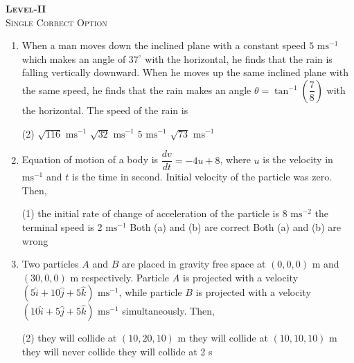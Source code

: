 \documentclass{article}
\renewcommand{\frac}[2]{\dfrac{#1}{#2}}
\begin{document}
\pagebreak

\begin{center}
    \textsc{\large\textbf{Level-II}}\\
    \textsc{Single Correct Option}
\end{center}
\begin{enumerate}
    \item When a man moves down the inclined plane with a constant speed \(5 \text{ ms}^{-1}\) which makes an angle of \(37^\circ\) with the horizontal, he finds that the rain is falling vertically downward. When he moves up the same inclined plane with the same speed, he finds that the rain makes an angle \(\theta = \tan^{-1}\left(\frac{7}{8}\right)\) with the horizontal. The speed of the rain is
    \begin{tasks}(2)
        \task \(\sqrt{116} \text{ ms}^{-1}\)
        \task \(\sqrt{32}  \text{ ms}^{-1}\)
        \task \(5 \text{ ms}^{-1}\)
        \task \(\sqrt{73}  \text{ ms}^{-1}\)
    \end{tasks}

    \item Equation of motion of a body is $\frac{dv}{dt} = -4u + 8$, where \( u \) is the velocity in \( \text{ms}^{-1} \) and \( t \) is the time in second. Initial velocity of the particle was zero. Then,
    \begin{tasks}(1)
        \task the initial rate of change of acceleration of the particle is 8 \( \text{ms}^{-2} \)
        \task the terminal speed is 2 \( \text{ms}^{-1} \)
        \task Both (a) and (b) are correct
        \task Both (a) and (b) are wrong
    \end{tasks}

    \item Two particles \( A \) and \( B \) are placed in gravity free space at \( (0, 0, 0) \) m and \( (30, 0, 0) \) m respectively. Particle \( A \) is projected with a velocity \( (5\hat{i} + 10\hat{j} + 5\hat{k}) \) \( \text{ms}^{-1} \), while particle \( B \) is projected with a velocity \( (10\hat{i} + 5\hat{j} + 5\hat{k}) \) \( \text{ms}^{-1} \) simultaneously. Then,
    \begin{tasks}(2)
        \task they will collide at \( (10, 20, 10) \) m
        \task they will collide at \( (10, 10, 10) \) m
        \task they will never collide
        \task they will collide at 2 s
    \end{tasks}


\end{enumerate}
\end{document}
